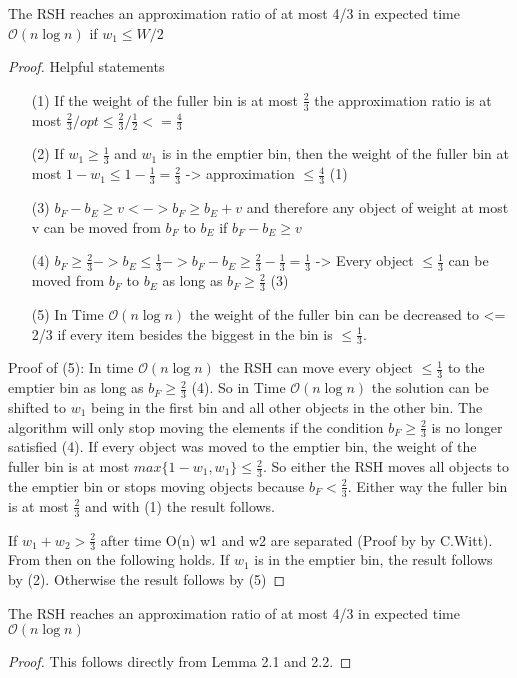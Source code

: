 \begin{lemma}
The RSH reaches an approximation ratio of at most 4/3 in expected time $\mathcal{O}(n\log{}n)$ if $w_1 \le W/2$ 
\end{lemma}
\begin{proof}
Helpful statements	
\begin{itemize}
    \item[(1)] If the weight of the fuller bin is at most $\frac{2}{3}$ the approximation ratio is at most \(\frac{2}{3} / opt \le \frac{2}{3} / \frac{1}{2} <= \frac{4}{3}\)
    \item[(2)] If \(w_1 \ge \frac{1}{3}\) and \(w_1\) is in the emptier bin, then the weight of the fuller bin at most \(1 - w_1 \le 1 - \frac{1}{3} = \frac{2}{3}\) -> approximation  \(\le \frac{4}{3}\) (1)
    \item[(3)] \(b_F - b_E \ge v <-> b_F \ge b_E + v\) and therefore any object of weight at most v can be moved from $b_F$ to $b_E$ if \(b_F - b_E \ge v\)
    \item[(4)] \(b_F \ge \frac{2}{3} -> b_E \le \frac{1}{3} -> b_F - b_E \ge \frac{2}{3} - \frac{1}{3} = \frac{1}{3}\) -> Every object \(\le \frac{1}{3}\) can be moved from $b_F$ to $b_E$ as long as \(b_F \ge \frac{2}{3}\) (3)
    \item[(5)] In Time $\mathcal{O}(n\log{}n)$ the weight of the fuller bin can be decreased to <= 2/3 if every item besides the biggest in the bin is $\le \frac{1}{3}$.
\end{itemize}
Proof of (5): \newline
In time $\mathcal{O}(n\log{}n)$ the RSH can move every object $\le \frac{1}{3}$ to the emptier bin as long as $b_F \ge \frac{2}{3}$ (4). So in Time $\mathcal{O}(n\log{}n)$ the solution can be shifted to $w_1$ being in the first bin and all other objects in the other bin. The algorithm will only stop moving the elements if the condition $b_F \ge \frac{2}{3}$ is no longer satisfied (4). If every object was moved to the emptier bin, the weight of the fuller bin is at most \(max\{1-w_1, w_1\} \le \frac{2}{3}\). So either the RSH moves all objects to the emptier bin or stops moving objects because $b_F < \frac{2}{3}$. Either way the fuller bin is at most $\frac{2}{3}$ and with (1) the result follows.


If \(w_1+w_2 > \frac{2}{3}\) after time O(n) w1 and w2 are separated (Proof by by C.Witt). From then on the following holds. If $w_1$ is in the emptier bin, the result follows by (2). Otherwise the result follows by (5)
\end{proof}

\begin{corollary}
    The RSH reaches an approximation ratio of at most 4/3 in expected time $\mathcal{O}(n\log{}n)$
\end{corollary}
\begin{proof}
    This follows directly from Lemma 2.1 and 2.2.
\end{proof}